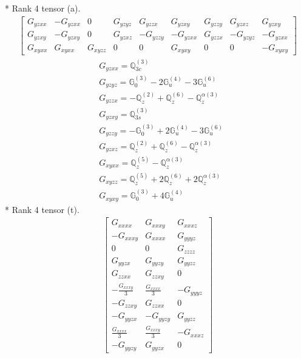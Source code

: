 \documentclass[fleqn,8pt,landscape]{jsarticle}
\begin{document}
* Rank 4 tensor (a).
\begin{align*}
\begin{bmatrix} G_{yzxx} & - G_{yzxx} & 0 & G_{yzyz} & G_{yzzx} & G_{yzxy} & G_{yzzy} & G_{yzxz} & G_{yzxy} \\ G_{yzxy} & - G_{yzxy} & 0 & G_{yzxz} & - G_{yzzy} & - G_{yzxx} & G_{yzzx} & - G_{yzyz} & - G_{yzxx} \\ G_{xyxx} & G_{xyxx} & G_{xyzz} & 0 & 0 & G_{xyxy} & 0 & 0 & - G_{xyxy} \end{bmatrix}
\end{align*}
\begin{align*}
& G_{yzxx} = \mathbb{Q}_{3c}^{(3)} \\
& G_{yzyz} = \mathbb{G}_{0}^{(3)} - 2 \mathbb{G}_{u}^{(4)} - 3 \mathbb{G}_{u}^{(6)} \\
& G_{yzzx} = - \mathbb{Q}_{z}^{(2)} + \mathbb{Q}_{z}^{(6)} - \mathbb{Q}_{z}^{\alpha(3)} \\
& G_{yzxy} = \mathbb{Q}_{3s}^{(3)} \\
& G_{yzzy} = - \mathbb{G}_{0}^{(3)} + 2 \mathbb{G}_{u}^{(4)} - 3 \mathbb{G}_{u}^{(6)} \\
& G_{yzxz} = \mathbb{Q}_{z}^{(2)} + \mathbb{Q}_{z}^{(6)} - \mathbb{Q}_{z}^{\alpha(3)} \\
& G_{xyxx} = \mathbb{Q}_{z}^{(5)} - \mathbb{Q}_{z}^{\alpha(3)} \\
& G_{xyzz} = \mathbb{Q}_{z}^{(5)} + 2 \mathbb{Q}_{z}^{(6)} + 2 \mathbb{Q}_{z}^{\alpha(3)} \\
& G_{xyxy} = \mathbb{G}_{0}^{(3)} + 4 \mathbb{G}_{u}^{(4)}
\end{align*}
* Rank 4 tensor (t).
\begin{align*}
\begin{bmatrix} G_{xxxx} & G_{xxxy} & G_{xxxz} \\ - G_{xxxy} & G_{xxxx} & G_{yyyz} \\ 0 & 0 & G_{zzzz} \\ G_{yyzx} & G_{yyzy} & G_{yyzz} \\ G_{zzxx} & G_{zzxy} & 0 \\ - \frac{G_{xxxy}}{3} & \frac{G_{xxxx}}{3} & - G_{yyyz} \\ - G_{zzxy} & G_{zzxx} & 0 \\ - G_{yyzx} & - G_{yyzy} & G_{yyzz} \\ \frac{G_{xxxx}}{3} & \frac{G_{xxxy}}{3} & - G_{xxxz} \\ - G_{yyzy} & G_{yyzx} & 0 \end{bmatrix}
\end{align*}
\end{document}
